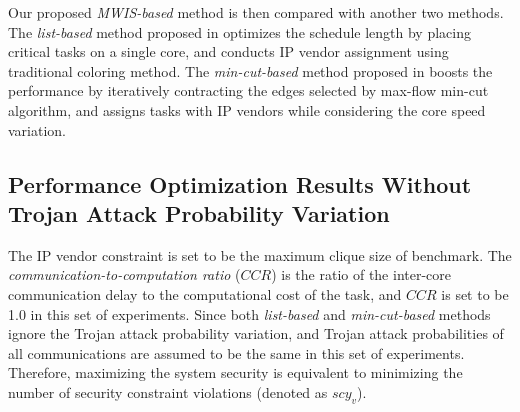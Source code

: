 \documentclass[10pt,journal]{IEEEtran}
\begin{document}

Our proposed \textit{MWIS-based} method is then compared with another two methods. The \textit{list-based} method proposed in \cite{article:CL} optimizes the schedule length by placing critical tasks on a single core, and conducts IP vendor assignment using traditional coloring method. The \textit{min-cut-based} method proposed in \cite{article:NW} boosts the performance by iteratively contracting the edges selected by max-flow min-cut algorithm, and assigns tasks with IP vendors while considering the core speed variation.



\subsection{Performance Optimization Results Without Trojan Attack Probability Variation}




The IP vendor constraint is set to be the maximum clique size of benchmark. The \textit{communication-to-computation ratio} ($CCR$) is the ratio of the inter-core communication delay to the computational cost of the task, and $CCR$ is set to be 1.0 in this set of experiments. Since both \textit{list-based} and \textit{min-cut-based} methods ignore the Trojan attack probability variation, and Trojan attack probabilities of all communications are assumed to be the same in this set of experiments. Therefore, maximizing the system security is equivalent to minimizing the number of security constraint violations (denoted as $scy_v$).
\end{document}
